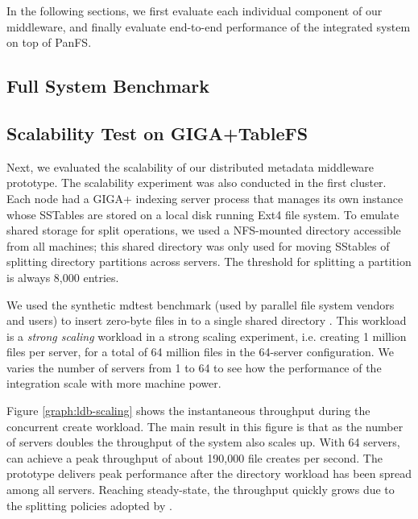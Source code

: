 In the following sections, we first evaluate each individual component
of our middleware, and finally evaluate end-to-end performance of
the integrated system on top of PanFS.

\subsection{Full System Benchmark}
\label{sec:fullsystem}


\subsection{Scalability Test on GIGA+TableFS}
Next, we evaluated the scalability of our distributed metadata middleware prototype.
The scalability experiment was also conducted in the first cluster.
Each node had a GIGA+ indexing server process that manages its own \tfs
instance whose SSTables are stored on a local disk running Ext4 file system.
To emulate shared storage for split operations,
we used a NFS-mounted directory accessible from all machines;
this shared directory was only used for moving SStables of
splitting directory partitions across servers.
The threshold for splitting a partition is always 8,000 entries.

We used the synthetic mdtest benchmark \cite{mdtest}
(used by parallel file system vendors and users) to insert
zero-byte files in to a single shared directory \cite{ceph:weil06, GIGA11}.
This workload is a \textit{strong scaling}
workload in a strong scaling experiment, i.e.
creating 1 million files per server, for a total of 64 million files in the
64-server configuration. We varies the number of servers from 1 to 64
to see how the performance of the integration scale with more machine power.

Figure \ref{graph:ldb-scaling} shows the instantaneous throughput
during the concurrent create workload.
The main result in this figure is that as the number of servers doubles the
throughput of the system also scales up. With 64 servers, \giga can achieve a
peak throughput of about 190,000 file creates per second.
The prototype delivers peak performance after the directory workload
has been spread among all servers.
Reaching steady-state, the throughput quickly grows
due to the splitting policies adopted by \giga.

